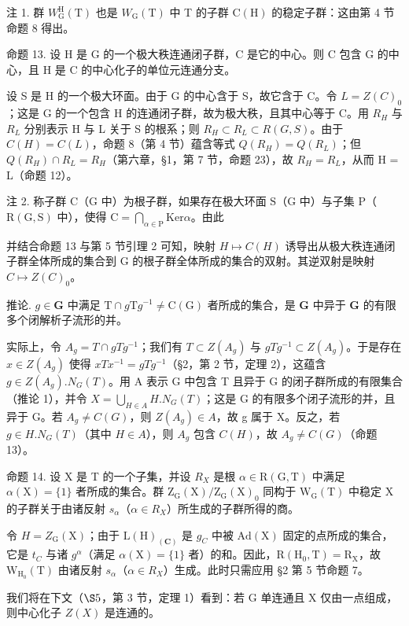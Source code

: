 注 1. 群 \(W_{\mathrm{G}}^{\mathrm{H}}(\mathrm{T})\) 也是 \(W_{\mathrm{G}}(\mathrm{T})\) 中 T 的子群 \(\mathrm{C}(\mathrm{H})\) 的稳定子群：这由第 4 节命题 8 得出。

命题 13. 设 H 是 G 的一个极大秩连通闭子群，C 是它的中心。则 C 包含 G 的中心，且 H 是 C 的中心化子的单位元连通分支。

设 S 是 H 的一个极大环面。由于 G 的中心含于 S，故它含于 C。令 \(L = Z(C)_{0}\)；这是 G 的一个包含 H 的连通闭子群，故为极大秩，且其中心等于 C。用 \(R_{H}\) 与 \(R_{L}\) 分别表示 H 与 L 关于 S 的根系；则 \(R_{H} \subset R_{L} \subset R(G, S)\)。由于 \(C(H) = C(L)\)，命题 8（第 4 节）蕴含等式 \(Q(R_{H}) = Q(R_{L})\)；但 \(Q(R_{H}) \cap R_{L} = R_{H}\)（第六章，§1，第 7 节，命题 23），故 \(R_{H} = R_{L}\)，从而 H = L（命题 12）。

注 2. 称子群 \(\mathrm{C}\)（\(\mathrm{G}\) 中）为根子群，如果存在极大环面 \(\mathrm{S}\)（\(\mathrm{G}\) 中）与子集 \(\mathrm{P}\)（\(\mathrm{R}(\mathrm{G},\mathrm{S})\) 中），使得 \(\mathrm{C} = \bigcap_{\alpha \in \mathrm{P}}\mathrm{Ker}\alpha\)。由此

并结合命题 13 与第 5 节引理 2 可知，映射 \(H \mapsto C(H)\) 诱导出从极大秩连通闭子群全体所成的集合到 G 的根子群全体所成的集合的双射。其逆双射是映射 \(C \mapsto Z(C)_{0}\)。

推论. \(g \in \mathbf{G}\) 中满足 \(\mathrm{T} \cap g\mathrm{T}g^{-1} \neq \mathrm{C}(\mathrm{G})\) 者所成的集合，是 \(\mathbf{G}\) 中异于 \(\mathbf{G}\) 的有限多个闭解析子流形的并。

实际上，令 \(A_{g} = T \cap gTg^{-1}\)；我们有 \(T \subset Z(A_{g})\) 与 \(gTg^{-1} \subset Z(A_{g})\)。于是存在 \(x \in Z(A_{g})\) 使得 \(xTx^{-1} = gTg^{-1}\)（§2，第 2 节，定理 2），这蕴含 \(g \in Z(A_{g}).N_{G}(T)\)。用 A 表示 G 中包含 T 且异于 G 的闭子群所成的有限集合（推论 1），并令 \(X = \bigcup_{H \in A} H.N_{G}(T)\)；这是 G 的有限多个闭子流形的并，且异于 G。若 \(A_{g} \neq C(G)\)，则 \(Z(A_{g}) \in A\)，故 g 属于 X。反之，若 \(g \in H.N_{G}(T)\)（其中 \(H \in A\)），则 \(A_{g}\) 包含 \(C(H)\)，故 \(A_{g} \neq C(G)\)（命题 13）。

命题 14. 设 X 是 T 的一个子集，并设 \(R_{X}\) 是根 \(\alpha \in \mathrm{R}(\mathrm{G}, \mathrm{T})\) 中满足 \(\alpha(\mathrm{X}) = \{1\}\) 者所成的集合。群 \(\mathrm{Z}_{\mathrm{G}}(\mathrm{X}) / \mathrm{Z}_{\mathrm{G}}(\mathrm{X})_{0}\) 同构于 \(\mathrm{W}_{\mathrm{G}}(\mathrm{T})\) 中稳定 X 的子群关于由诸反射 \(s_{\alpha}\)（\(\alpha \in R_{X}\)）所生成的子群所得的商。

令 \(H = Z_{\mathrm{G}}(\mathrm{X})\)；由于 \(\mathrm{L}(\mathrm{H})_{(\mathbf{C})}\) 是 \(g_{C}\) 中被 \(\mathrm{Ad}(\mathrm{X})\) 固定的点所成的集合，它是 \(t_{C}\) 与诸 \(g^{\alpha}\)（满足 \(\alpha(\mathrm{X}) = \{1\}\) 者）的和。因此，\(\mathrm{R}(\mathrm{H}_{0}, \mathrm{T}) = \mathrm{R}_{\mathrm{X}}\)，故 \(\mathrm{W}_{\mathrm{H}_{0}}(\mathrm{T})\) 由诸反射 \(s_{\alpha}\)（\(\alpha \in R_{X}\)）生成。此时只需应用 §2 第 5 节命题 7。

我们将在下文（\(\S5\)，第 3 节，定理 1）看到：若 G 单连通且 X 仅由一点组成，则中心化子 \(Z(X)\) 是连通的。

